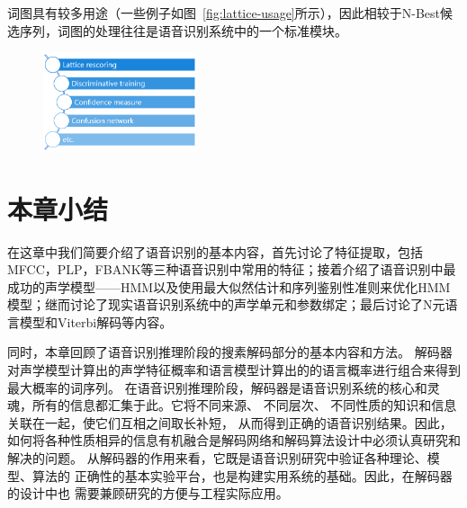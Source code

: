 词图具有较多用途（一些例子如图~\ref{fig:lattice-usage}所示），因此相较于N-Best候选序列，词图的处理往往是语音识别系统中的一个标准模块。

\begin{figure}[!htp]
  \centering
    \captionstyle{\centering}
    \includegraphics[clip=true, width=0.4\textwidth]{figure/lattice_usage.png}
\end{figure}


\section{本章小结}
\label{chap:intro-sum}

在这章中我们简要介绍了语音识别的基本内容，首先讨论了特征提取，包括MFCC，PLP，FBANK等三种语音识别中常用的特征；接着介绍了语音识别中最成功的声学模型——HMM以及使用最大似然估计和序列鉴别性准则来优化HMM模型；继而讨论了现实语音识别系统中的声学单元和参数绑定；最后讨论了N元语言模型和Viterbi解码等内容。

同时，本章回顾了语音识别推理阶段的搜素解码部分的基本内容和方法。
解码器对声学模型计算出的声学特征概率和语言模型计算出的的语言概率进行组合来得到最大概率的词序列。
%
在语音识别推理阶段，解码器是语音识别系统的核心和灵魂，所有的信息都汇集于此。它将不同来源、 不同层次、 不同性质的知识和信息关联在一起，使它们互相之间取长补短， 从而得到正确的语音识别结果。因此，如何将各种性质相异的信息有机融合是解码网络和解码算法设计中必须认真研究和解决的问题。
从解码器的作用来看，它既是语音识别研究中验证各种理论、模型、算法的
正确性的基本实验平台，也是构建实用系统的基础。因此，在解码器的设计中也
需要兼顾研究的方便与工程实际应用。